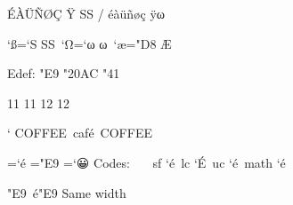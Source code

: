 \documentclass{article}
\begin{document}
\uppercase{éàüñøç ÿ ß} / \lowercase{ÉÀÜÑØÇ ŸΩ}\par
{\uccode`ß=`S \uppercase{ß}\ \lccode`Ω=`ω \lowercase{Ω}\ \uccode`æ="D8 \uppercase{æ}}\par
\edef\x{\Uchar"E9 \Uchar"20AC \Uchar"41 }Edef: \x\par
{} 11  11  12  12\par
\catcode` \def\café{COFFEE}\café\ \csname café\endcsname\ \string\café\par
{}=`é ="E9 =`😀
Codes: \the{}\ \the{}\ \the{}\ sf \the\sfcode`é\ lc \the\lccode`É\ uc \the\uccode`é\ math \the\mathcode`é\par
\def\br#1{[#1]}\expandafter\br{}\par
{}\par
{}\hbox{\Uchar"E9 }\hbox{é}\hbox{\char"E9}
Same width \the{} \the{} \the{}\par
\end{document}
